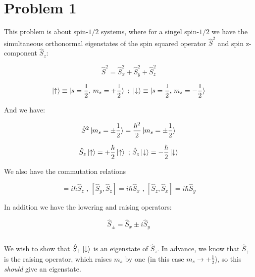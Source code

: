 \documentclass[11pt]{article}
\begin{document}
\section{Problem 1} \begin{flushleft}
This problem is about spin-$1/2$ systems, where for a singel spin-$1/2$ we have the simultaneous orthonormal eigenstates of the spin squared operator $\hat{S}^2$ and spin z-component $\hat{S}_z$:

\begin{equation}
\hat{S}^2 = \hat{S}_x^2 + \hat{S}_y^2 + \hat{S}_z^2
\end{equation}

\begin{equation}
\ket{\uparrow} \equiv
\ket{s= \frac{1}{2} \text{, } m_s = + \frac{1}{2}} \text{ ; } \ket{\downarrow} \equiv
\ket{s= \frac{1}{2} \text{, } m_s = - \frac{1}{2}}
\end{equation}

And we have:

\begin{equation}
\hat{S}^2 \ket{m_s = \pm\frac{1}{2} }  = \frac{\hbar^2}{2} \ket{m_s = \pm \frac{1}{2}}
\end{equation}

\begin{equation}
\hat{S}_z \ket{\uparrow} = +\frac{\hbar}{2} \ket{\uparrow} \text{ ; }
\hat{S}_z \ket{\downarrow} = -\frac{\hbar}{2} \ket{\downarrow}
\end{equation}

We also have the commutation relations

\begin{equation}
[ \hat{S}_x, \hat{S}_y ] = i \hbar \hat{S}_z \text{ , } [ \hat{S}_y, \hat{S}_z ] = i \hbar \hat{S}_x \text{ , }
[ \hat{S}_z, \hat{S}_x ] = i \hbar \hat{S}_y
\end{equation}

In addition we have the lowering and raising operators:

\begin{equation}
\hat{S}_{\pm} = \hat{S}_x \pm i \hat{S}_y
\end{equation}
\end{flushleft}

\pagebreak
\subsection{}

\begin{flushleft}
We wish to show that $\hat{S}_+ \ket{\downarrow}$ is an eigenstate of $\hat{S}_z$. In advance, we know that $\hat{S}_+$ is the raising operator, which raises $m_s$ by one (in this case $m_s \rightarrow +\frac{1}{2}$), so this \textit{should } give an eigenstate.
\end{flushleft}
\end{document}
